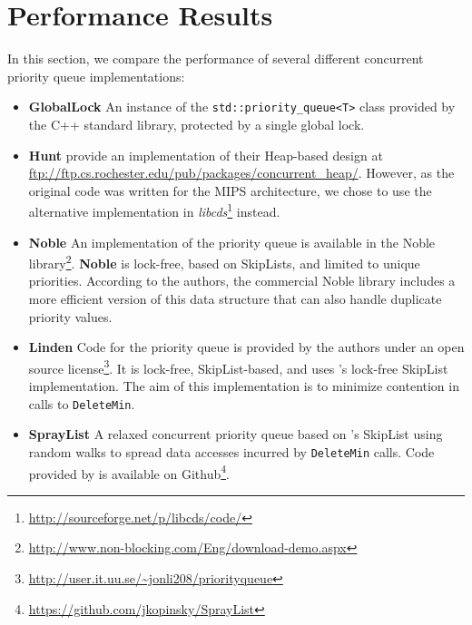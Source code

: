 \documentclass[a4paper,10pt]{article}
\begin{document}

\section{Performance Results}

In this section, we compare the performance of several different concurrent priority
queue implementations:

\begin{itemize}
\item \textbf{GlobalLock} An instance of the \lstinline|std::priority_queue<T>| class provided
      by the C++ standard library, protected by a single global lock.
\item \textbf{Hunt} \citeauthor{hunt1996efficient} provide an implementation
      of their Heap-based design \cite{hunt1996efficient} at \url{ftp://ftp.cs.rochester.edu/pub/packages/concurrent_heap/}.
      However, as the original code was written for the MIPS architecture, we chose to
      use the alternative implementation in \emph{libcds}\footnote{\url{http://sourceforge.net/p/libcds/code/}}
      instead.
\item \textbf{Noble} An implementation of the \citeauthor{sundell2003fast} priority queue \cite{sundell2003fast}
      is available in the Noble library\footnote{\url{http://www.non-blocking.com/Eng/download-demo.aspx}}.
      \textbf{Noble} is lock-free, based on SkipLists, and limited to unique priorities.
      According to the authors, the commercial Noble library includes a more efficient
      version of this data structure that can also handle duplicate priority values.
\item \textbf{Linden} Code for the \citeauthor{linden2013skiplist} priority queue \cite{linden2013skiplist}
      is provided by the authors under an open source license\footnote{\url{http://user.it.uu.se/~jonli208/priorityqueue}}.
      It is lock-free, SkipList-based, and uses \citeauthor{fraser2004practical}'s lock-free
      SkipList implementation. The aim of this implementation is to minimize contention in
      calls to \lstinline|DeleteMin|.
\item \textbf{SprayList} A relaxed concurrent priority queue based on \citeauthor{fraser2004practical}'s
      SkipList using random walks to spread data accesses
      incurred by \lstinline|DeleteMin| calls. Code provided by \citeauthor{alistarhspraylist} is
      available on Github\footnote{\url{https://github.com/jkopinsky/SprayList}}.
\end{itemize}
\end{document}
